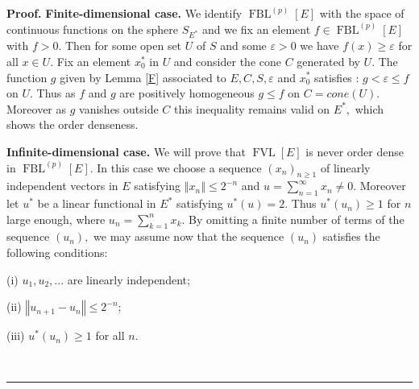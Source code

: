 \documentclass[10pt,a4paper]{amsart}
\newenvironment{proof}[1][Proof]{\noindent\textbf{#1.} }{\ \rule{0.5em}{0.5em}}
\begin{document}
\begin{proof}
\textbf{Finite-dimensional case.} We identify $\operatorname*{FBL}%
\nolimits^{\left(  p\right)  }\left[  E\right]  $ with the space of continuous
functions on the sphere $S_{E^{\ast}}$ and we fix an element $f\in
\operatorname*{FBL}\nolimits^{\left(  p\right)  }\left[  E\right]  $ with
$f>0.$ Then for some open set $U$ of $S$ and some $\varepsilon>0$ we have
$f\left(  x\right)  \geq\varepsilon$ for all $x\in U.$ Fix an element
$x_{0}^{\ast}$ in $U$ and consider the cone $C$ generated by $U.$ The function
$g$ given by Lemma \ref{F} associated to $E,C,S,\varepsilon$ and $x_{0}^{\ast
}$ satisfies : $g<\varepsilon\leq f$ on $U.$ Thus as $f$ and $g$ are
positively homogeneous $g\leq f$ on $C=cone\left(  U\right)  .$ Moreover as
$g$ vanishes outside $C$ this inequality remains valid on $E^{\ast},$ which
shows the order denseness.

\textbf{Infinite-dimensional case.} We will prove that $\operatorname*{FVL}%
\left[  E\right]  $ is never order dense in $\operatorname*{FBL}%
\nolimits^{(p)}\left[  E\right]  .$ In this case we choose a sequence $\left(
x_{n}\right)  _{n\geq1}$ of linearly independent vectors in $E$ satisfying
$\left\Vert x_{n}\right\Vert \leq2^{-n}$ and $u=%
{\textstyle\sum\limits_{n=1}^{\infty}}
x_{n}\neq0.$ Moreover let $u^{\ast}$ be a linear functional in $E^{\ast}$
satisfying $u^{\ast}\left(  u\right)  =2.$ Thus $u^{\ast}\left(  u_{n}\right)
\geq1$ for $n$ large enough, where $u_{n}=%
{\textstyle\sum\limits_{k=1}^{n}}
x_{k}.$ By omitting a finite number of terms of the sequence $\left(
u_{n}\right)  ,$ we may assume now that the sequence $\left(  u_{n}\right)  $
satisfies the following conditions:

(i) $u_{1},u_{2},...$ are linearly independent;

(ii) $\left\Vert u_{n+1}-u_{n}\right\Vert \leq2^{-n};$

(iii) $u^{\ast}\left(  u_{n}\right)  \geq1$ for all $n.$


\end{proof}
\end{document}
